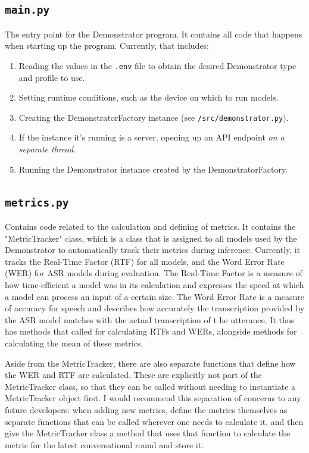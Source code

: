 \subsection{\texttt{main.py}}
The entry point for the Demonstrator program.
It contains all code that happens when starting up the program.
Currently, that includes:
\begin{enumerate}
    \item Reading the values in the \texttt{.env} file to obtain the desired Demonstrator type and profile to use.
    \item Setting runtime conditions, such as the device on which to run models.
    \item Creating the DemonstratorFactory instance (see \texttt{/src/demonstrator.py}).
    \item If the instance it's running is a server, opening up an API endpoint \textit{on a separate thread}.
    \item Running the Demonstrator instance created by the DemonstratorFactory.
\end{enumerate}

\subsection{\texttt{metrics.py}}
Contains code related to the calculation and defining of metrics.
It contains the "MetricTracker" class, which is a class that is assigned to all models used by the Demonstrator to automatically track their metrics during inference.
Currently, it tracks the Real-Time Factor (RTF) for all models, and the Word Error Rate (WER) for ASR models during evaluation.
The Real-Time Factor is a measure of how time-efficient a model was in its calculation and expresses the speed at which a model can process an input of a certain size.
The Word Error Rate is a measure of accuracy for speech and describes how accurately the transcription provided by the ASR model matches with the actual transcription of t he utterance.
It thus has methods that called for calculating RTFs and WERs, alongside methods for calculating the mean of these metrics.

Aside from the MetricTracker, there are also separate functions that define how the WER and RTF are calculated.
These are explicitly not part of the MetricTracker class, so that they can be called without needing to instantiate a MetricTracker object first.
I would recommend this separation of concerns to any future developers: when adding new metrics, define the metrics themselves as separate functions that can be called wherever one needs to calculate it, and then give the MetricTracker class a method that uses that function to calculate the metric for the latest conversational round and store it.

